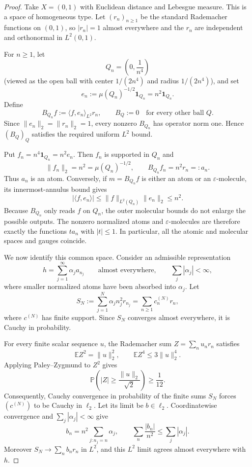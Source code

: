 \documentclass[11pt]{article}
\newcommand{\1}{\mathbf 1}
\newcommand{\eps}{\varepsilon}
\begin{document}
\begin{proof}
Take $X=(0,1)$ with Euclidean distance and Lebesgue measure. This is a space of homogeneous type. Let $(r_n)_{n\geq1}$ be the standard Rademacher functions on $(0,1)$, so $|r_n|=1$ almost everywhere and the $r_n$ are independent and orthonormal in $L^2(0,1)$.

For $n\geq1$, let
\[
  Q_n=\left(0,\frac1{n^4}\right)
\]
(viewed as the open ball with center $1/(2n^4)$ and radius $1/(2n^4)$), and set
\[
  e_n:=\mu(Q_n)^{-1/2}\1_{Q_n}=n^2\1_{Q_n}.
\]
Define
\[
  B_{Q_n}f:=\langle f,e_n\rangle_{L^2}r_n,
  \qquad B_Q:=0\quad\text{for every other ball }Q.
\]
Since $\|e_n\|_2=\|r_n\|_2=1$, every nonzero $B_{Q_n}$ has operator norm one. Hence $(B_Q)_Q$ satisfies the required uniform $L^2$ bound.

Put $f_n=n^4\1_{Q_n}=n^2e_n$. Then $f_n$ is supported in $Q_n$ and
\[
  \|f_n\|_2=n^2=\mu(Q_n)^{-1/2},
  \qquad B_{Q_n}f_n=n^2r_n=:a_n.
\]
Thus $a_n$ is an atom. Conversely, if $m=B_{Q_n}f$ is either an atom or an $\eps$-molecule, its innermost-annulus bound gives
\[
  |\langle f,e_n\rangle|
  \leq \|f\|_{L^2(Q_n)}\|e_n\|_2
  \leq n^2.
\]
Because $B_{Q_n}$ only reads $f$ on $Q_n$, the outer molecular bounds do not enlarge the possible outputs. The nonzero normalized atoms and $\eps$-molecules are therefore exactly the functions $t a_n$ with $|t|\leq1$. In particular, all the atomic and molecular spaces and gauges coincide.

We now identify this common space. Consider an admissible representation
\[
  h=\sum_{j=1}^\infty \alpha_j a_{n_j}\qquad\text{almost everywhere},
  \qquad \sum_j|\alpha_j|<\infty,
\]
where smaller normalized atoms have been absorbed into $\alpha_j$. Let
\[
  S_N:=\sum_{j=1}^N\alpha_jn_j^2r_{n_j}
       =\sum_{n\geq1}c_n^{(N)}r_n,
\]
where $c^{(N)}$ has finite support. Since $S_N$ converges almost everywhere, it is Cauchy in probability.

For every finite scalar sequence $u$, the Rademacher sum $Z=\sum_nu_nr_n$ satisfies
\[
  \mathbb E Z^2=\|u\|_2^2,
  \qquad \mathbb E Z^4\leq3\|u\|_2^4.
\]
Applying Paley--Zygmund to $Z^2$ gives
\[
  \mathbb P\left(|Z|\geq\frac{\|u\|_2}{\sqrt2}\right)\geq\frac1{12}.
\]
Consequently, Cauchy convergence in probability of the finite sums $S_N$ forces $(c^{(N)})$ to be Cauchy in $\ell_2$. Let its limit be $b\in\ell_2$. Coordinatewise convergence and $\sum_j|\alpha_j|<\infty$ give
\[
  b_n=n^2\sum_{j:n_j=n}\alpha_j,
  \qquad
  \sum_n\frac{|b_n|}{n^2}\leq\sum_j|\alpha_j|.
\]
Moreover $S_N\to\sum_nb_nr_n$ in $L^2$, and this $L^2$ limit agrees almost everywhere with $h$.


\end{proof}
\end{document}
